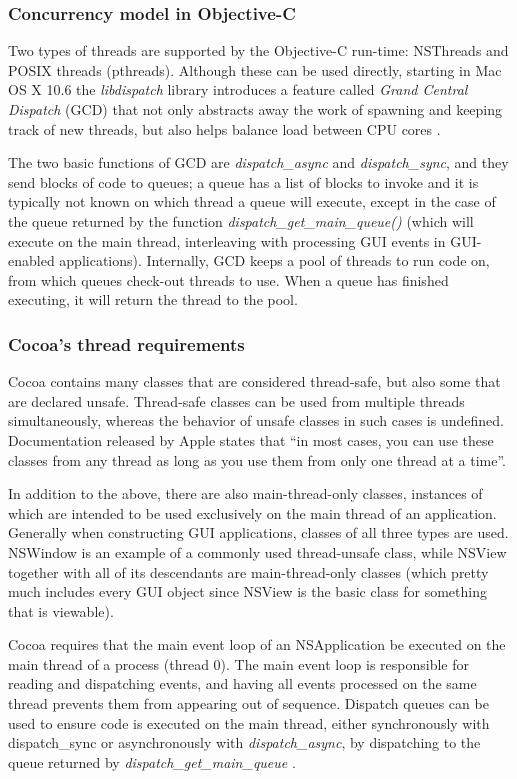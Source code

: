 \documentclass[a4paper]{article}
\begin{document}
\subsubsection*{Concurrency model in Objective-C}
Two types of threads are supported by the Objective-C run-time: NSThreads and POSIX threads (pthreads). Although these can be used directly, starting in Mac OS X 10.6 the \textit{libdispatch} library introduces a feature called \textit{Grand Central Dispatch} (GCD) that not only abstracts away the work of spawning and keeping track of new threads, but also helps balance load between CPU cores \cite{cocoaGCD}.

The two basic functions of GCD are \textit{dispatch\_async} and \textit{dispatch\_sync}, and they send blocks of code to queues; a queue has a list of blocks to invoke and it is typically not known on which thread a queue will execute, except in the case of the queue returned by the function \textit{dispatch\_get\_main\_queue()} (which will execute on the main thread, interleaving with processing GUI events in GUI-enabled applications). Internally, GCD keeps a pool of threads to run code on, from which queues check-out threads to use. When a queue has finished executing, it will return the thread to the pool.

\subsubsection*{Cocoa's thread requirements}
Cocoa contains many classes that are considered thread-safe, but also some that are declared unsafe. Thread-safe classes can be used from multiple threads simultaneously, whereas the behavior of unsafe classes in such cases is undefined. Documentation released by Apple states that ``in most cases, you can use these classes from any thread as long as you use them from only one thread at a time''.

In addition to the above, there are also main-thread-only classes, instances of which are intended to be used exclusively on the main thread of an application. Generally when constructing GUI applications, classes of all three types are used. NSWindow is an example of a commonly used thread-unsafe class, while NSView together with all of its descendants are main-thread-only classes (which pretty much includes every GUI object since NSView is the basic class for something that is viewable). 

Cocoa requires that the main event loop of an NSApplication be executed on the main thread of a process (thread 0). The main event loop is responsible for reading and dispatching events, and having all events processed on the same thread prevents them from appearing out of sequence. Dispatch queues can be used to ensure code is executed on the main thread, either synchronously with dispatch\_sync or asynchronously with \textit{dispatch\_async}, by dispatching to the queue returned by  \textit{dispatch\_get\_main\_queue} \cite{gcdMainQueue}.
\end{document}
